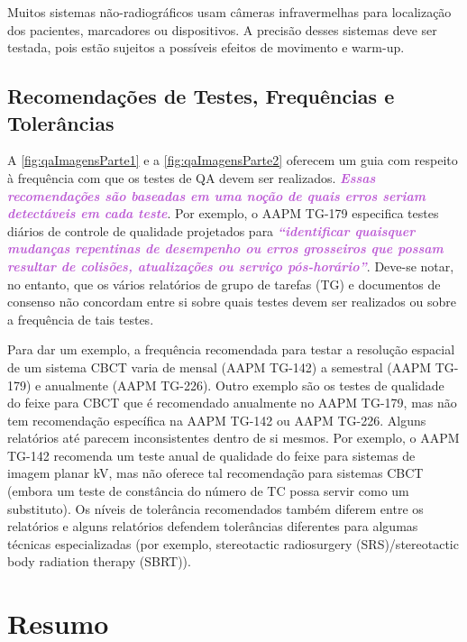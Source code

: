 \documentclass[11pt,a4paper]{article}
\newcounter{exemplo}
\begin{document}
    Muitos sistemas não-radiográficos usam câmeras infravermelhas para localização dos pacientes, marcadores ou dispositivos. A precisão desses sistemas deve ser testada, pois estão sujeitos a possíveis efeitos de movimento e warm-up.

\subsection*{Recomendações de Testes, Frequências e Tolerâncias}

    A \ref{fig:qaImagensParte1} e a \ref{fig:qaImagensParte2} oferecem um guia com respeito à frequência com que os testes de QA devem ser realizados. \textcolor{MediumOrchid}{\textbf{\textit{Essas recomendações são baseadas em uma noção de quais erros seriam detectáveis em cada teste}}}. Por exemplo, o AAPM TG-179 especifica testes diários de controle de qualidade projetados para \textcolor{MediumOrchid}{\textbf{\textit{“identificar quaisquer mudanças repentinas de desempenho ou erros grosseiros que possam resultar de colisões, atualizações ou serviço pós-horário”}}}. Deve-se notar, no entanto, que os vários relatórios de grupo de tarefas (TG) e documentos de consenso não concordam entre si sobre quais testes devem ser realizados ou sobre a frequência de tais testes.

    Para dar um exemplo, a frequência recomendada para testar a resolução espacial de um sistema CBCT varia de mensal (AAPM TG-142) a semestral (AAPM TG-179) e anualmente (AAPM TG-226). Outro exemplo são os testes de qualidade do feixe para CBCT que é recomendado anualmente no AAPM TG-179, mas não tem recomendação específica na AAPM TG-142 ou AAPM TG-226. Alguns relatórios até parecem inconsistentes dentro de si mesmos. Por exemplo, o AAPM TG-142 recomenda um teste anual de qualidade do feixe para sistemas de imagem planar kV, mas não oferece tal recomendação para sistemas CBCT (embora um teste de constância do número de TC possa servir como um substituto). Os níveis de tolerância recomendados também diferem entre os relatórios e alguns relatórios defendem tolerâncias diferentes para algumas técnicas especializadas (por exemplo, stereotactic radiosurgery (SRS)/stereotactic body radiation therapy (SBRT)). 

\section{Resumo}
\end{document}
